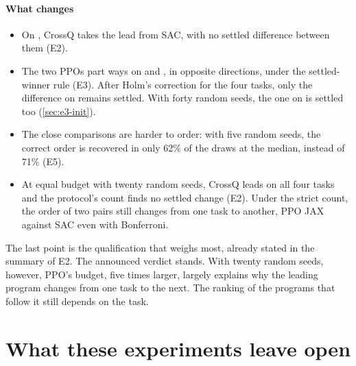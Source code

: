 \paragraph{What changes}
\begin{itemize}
  \item On , CrossQ takes the lead from SAC, with no settled difference between them (E2).
  \item The two PPOs part ways on  and , in opposite directions, under
    the settled-winner rule (E3). After Holm's correction for the four tasks, only the difference on
     remains settled. With forty random seeds, the one on  is settled too
    (\cref{sec:e3-init}).
  \item The close comparisons are harder to order: with five random seeds, the correct order is recovered in
    only 62\% of the draws at the median, instead of 71\% (E5).
  \item At equal budget with twenty random seeds, CrossQ leads on all four tasks and the protocol's count
    finds no settled change (E2). Under the strict count, the order of two pairs still changes from one task
    to another, PPO JAX against SAC even with Bonferroni.
\end{itemize}
The last point is the qualification that weighs most, already stated in the summary of E2. The announced
verdict stands. With twenty random seeds, however, PPO's budget, five times larger, largely explains why the
leading program changes from one task to the next. The ranking of the programs that follow it still depends on
the task.

\section{What these experiments leave open}\label{sec:limites-experiences}

